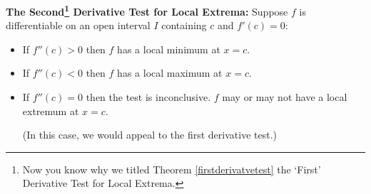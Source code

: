\documentclass{ximera}
\begin{document}
\begin{theorem}  \label{secondderivatvetest}   \textbf{The Second\footnote{Now you know why we titled Theorem \ref{firstderivatvetest} the `First' Derivative Test for Local Extrema.} Derivative Test for Local Extrema:}  Suppose $f$ is differentiable on an open interval $I$ containing $c$ and $f'(c) = 0$:

\begin{itemize}

\item If $f''(c) > 0$ then $f$ has a local minimum at $x=c$.

\item If $f''(c) < 0$ then $f$ has a local maximum at $x=c$.

\item If $f''(c) = 0$ then the test is inconclusive.  $f$ may or may not have a local extremum at $x=c$.  

(In this case, we would appeal to the first derivative test.)

\end{itemize}
\end{theorem}

\end{document}
